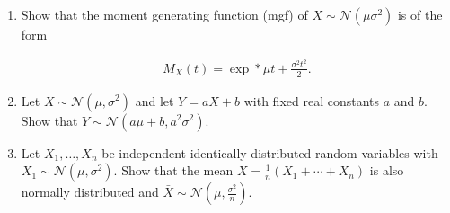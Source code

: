 
\begin{exercise}

\phantom{}

\begin{enumerate}[label = (\alph*)]

    \item Show that the moment generating function (mgf) of $X \sim \mathcal N(\mu \sigma^2)$ is of the form
    
    \begin{align*}
        M_X(t) = \exp*{\mu t + \frac{\sigma^2 t^2}{2}}.
    \end{align*}

    \item Let $X \sim \mathcal N(\mu, \sigma^2)$ and let $Y = a X + b$ with fixed real constants $a$ and $b$.
    Show that $Y \sim \mathcal N(a \mu + b, a^2 \sigma^2)$.

    \item Let $X_1, \dots, X_n$ be independent identically distributed random variables with $X_1 \sim \mathcal N(\mu, \sigma^2)$.
    Show that the mean $\bar X = \frac{1}{n} (X_1 + \cdots + X_n)$ is also normally distributed and $\bar X \sim \mathcal N(\mu, \frac{\sigma^2}{n})$.

\end{enumerate}

\end{exercise}


